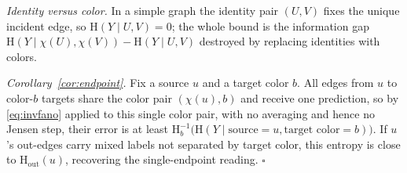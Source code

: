 \documentclass[sigconf]{acmart}
\newcommand{\Hh}{\mathrm{H}}
\newcommand{\outdeg}{\mathrm{out}}
\theoremstyle{plain}
\theoremstyle{definition}
\begin{document}
\emph{Identity versus color.} In a simple graph the identity pair $(U,V)$ fixes the unique incident edge, so $\Hh(Y\mid U,V)=0$; the whole bound is the information gap $\Hh(Y\mid \chi(U),\chi(V))-\Hh(Y\mid U,V)$ destroyed by replacing identities with colors. 

\emph{Corollary~\ref{cor:endpoint}.} Fix a source $u$ and a target color $b$. All edges from $u$ to color-$b$ targets share the color pair $(\chi(u),b)$ and receive one prediction, so by \eqref{eq:invfano} applied to this single color pair, with no averaging and hence no Jensen step, their error is at least $\Hh_b^{-1}\big(\Hh(Y\mid \text{source}{=}u,\text{target color}{=}b)\big)$. If $u$'s out-edges carry mixed labels not separated by target color, this entropy is close to $\Hh_\outdeg(u)$, recovering the single-endpoint reading. $\square$




\end{document}
